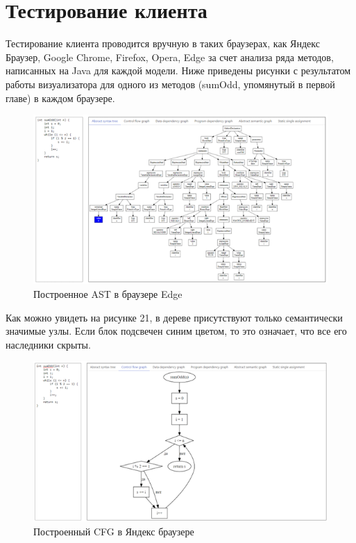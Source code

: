 \section{Тестирование клиента} \label{ch6:sec2}
Тестирование клиента проводится вручную в таких браузерах, как Яндекс Браузер, Google Chrome, Firefox, Opera, Edge за счет анализа ряда методов, написанных на Java для каждой модели. Ниже приведены рисунки с результатом работы визуализатора для одного из методов (sumOdd, упомянутый в первой главе) в каждом браузере.
\begin{figure}[ht!] 
	\center
	\includegraphics [scale=0.27] {my_folder/images/my/21}
	\caption{Построенное AST в браузере Edge} 
	\label{fig:21}  
\end{figure}
Как можно увидеть на рисунке 21, в дереве присутствуют только семантически значимые узлы. Если блок подсвечен синим цветом, то это означает, что все его наследники скрыты.
\begin{figure}[ht!] 
	\center
	\includegraphics [scale=0.27] {my_folder/images/my/22}
	\caption{Построенный CFG в Яндекс браузере} 
	\label{fig:22}  
\end{figure}
